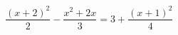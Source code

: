 \begin{ex}
	\begin{condition}
		\( \dfrac{(x+2)^2}{2}-\dfrac{x^2+2x}{3}=3+\dfrac{(x+1)^2}{4} \)
	\end{condition}
\end{ex}